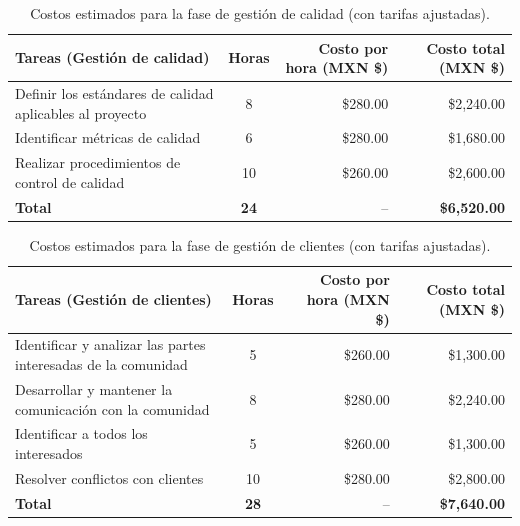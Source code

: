 \begin{table}[H]
	\centering
	\renewcommand{\arraystretch}{1.6}
	\setlength{\tabcolsep}{10pt}
	\Huge
	\begin{adjustbox}{max width=\textwidth}
		\begin{tabular}{|p{9.5cm}|c|r|r|}
			\hline
			\textbf{Tareas (Gestión de calidad)} & \textbf{Horas} & \textbf{Costo por hora (MXN \$)} & \textbf{Costo total (MXN \$)} \\ \hline
			Definir los estándares de calidad aplicables al proyecto & 8 & \$280.00 & \$2,240.00 \\ \hline
			Identificar métricas de calidad & 6 & \$280.00 & \$1,680.00 \\ \hline
			Realizar procedimientos de control de calidad & 10 & \$260.00 & \$2,600.00 \\ \hline
			\textbf{Total} & \textbf{24} & -- & \textbf{\$6,520.00} \\ \hline
		\end{tabular}
	\end{adjustbox}
	\caption{Costos estimados para la fase de gestión de calidad (con tarifas ajustadas).}
	\label{tab:costos_calidad_actualizado}
\end{table}

\begin{table}[H]
	\centering
	\renewcommand{\arraystretch}{1.6}
	\setlength{\tabcolsep}{10pt}
	\Huge
	\begin{adjustbox}{max width=\textwidth}
		\begin{tabular}{|p{9.5cm}|c|r|r|}
			\hline
			\textbf{Tareas (Gestión de clientes)} & \textbf{Horas} & \textbf{Costo por hora (MXN \$)} & \textbf{Costo total (MXN \$)} \\ \hline
			Identificar y analizar las partes interesadas de la comunidad & 5 & \$260.00 & \$1,300.00 \\ \hline
			Desarrollar y mantener la comunicación con la comunidad & 8 & \$280.00 & \$2,240.00 \\ \hline
			Identificar a todos los interesados & 5 & \$260.00 & \$1,300.00 \\ \hline
			Resolver conflictos con clientes & 10 & \$280.00 & \$2,800.00 \\ \hline
			\textbf{Total} & \textbf{28} & -- & \textbf{\$7,640.00} \\ \hline
		\end{tabular}
	\end{adjustbox}
	\caption{Costos estimados para la fase de gestión de clientes (con tarifas ajustadas).}
	\label{tab:costos_clientes_actualizado}
\end{table}

